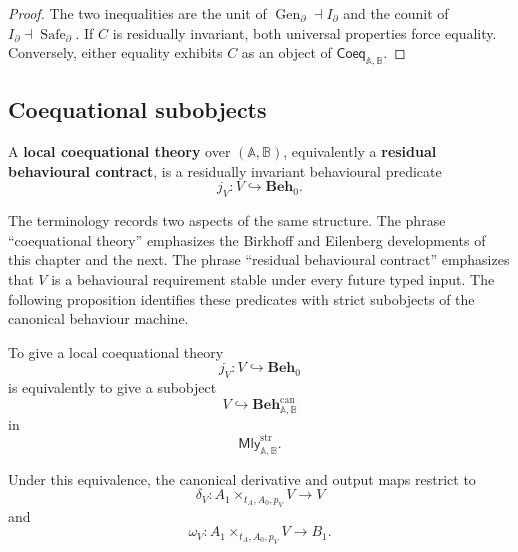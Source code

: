 \begin{proof}
    The two inequalities are the unit of
    \(\operatorname{Gen}_\partial\dashv I_\partial\) and the counit of
    \(I_\partial\dashv\operatorname{Safe}_\partial\). If \(C\) is residually
    invariant, both universal properties force equality. Conversely, either
    equality exhibits \(C\) as an object of
    \(\mathsf{Coeq}_{\mathbb A,\mathbb B}\).
\end{proof}

\subsection{Coequational subobjects}
\label{subsec:coequational-subobjects}

\begin{definition}
\label{def:local-coequational-theory}
    A \textbf{local coequational theory} over
    \((\mathbb A,\mathbb B)\), equivalently a \textbf{residual behavioural
    contract}, is a residually invariant behavioural predicate
    \[
        j_V:V\hookrightarrow\mathbf{Beh}_0.
    \]
\end{definition}

The terminology records two aspects of the same structure. The phrase
``coequational theory'' emphasizes the Birkhoff and Eilenberg developments of
this chapter and the next. The phrase ``residual behavioural contract''
emphasizes that \(V\) is a behavioural requirement stable under every future
typed input. The following proposition identifies these predicates with
strict subobjects of the canonical behaviour machine.

\begin{proposition}
\label{prop:subobjects-canonical-behaviour-machine}
    To give a local coequational theory
    \[
        j_V:V\hookrightarrow\mathbf{Beh}_0
    \]
    is equivalently to give a subobject
    \[
        V\hookrightarrow
        \mathbf{Beh}^{\mathrm{can}}_{\mathbb A,\mathbb B}
    \]
    in
    \[
        \mathsf{Mly}^{\mathrm{str}}_{\mathbb A,\mathbb B}.
    \]

    Under this equivalence, the canonical derivative and output maps restrict
    to
    \[
        \delta_V:
        A_1\times_{t_A,A_0,p_V}V\to V
    \]
    and
    \[
        \omega_V:
        A_1\times_{t_A,A_0,p_V}V\to B_1.
    \]
\end{proposition}


